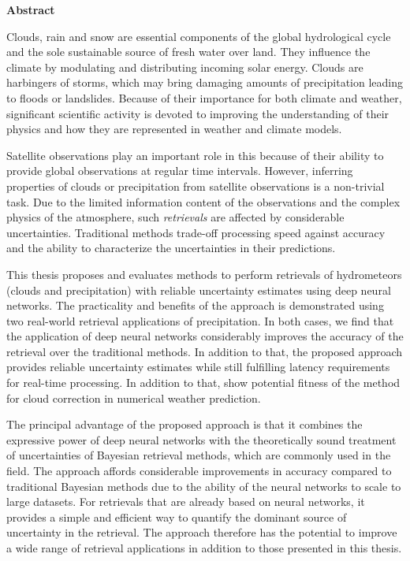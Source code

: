 \thispagestyle{plain}
\begin{center}
  {\large \textbf{\thetitle}}
  
  \vspace{0.4cm}
  
  \vspace{0.4cm}
  {\sc \theauthor}
  
  \vspace{0.9cm}
  \textbf{Abstract}
\end{center}

Clouds, rain and snow are essential components of the global hydrological cycle
and the sole sustainable source of fresh water over land. They influence the
climate by modulating and distributing incoming solar energy. Clouds are
harbingers of storms, which may bring damaging amounts of precipitation leading
to floods or landslides. Because of their importance for both climate and
weather, significant scientific activity is devoted to improving the
understanding of their physics and how they are represented in weather and
climate models.

Satellite observations play an important role in this because of their ability
to provide global observations at regular time intervals. However, inferring
properties of clouds or precipitation from satellite observations is a
non-trivial task. Due to the limited information content of the observations and
the complex physics of the atmosphere, such \textit{retrievals} are affected by
considerable uncertainties. Traditional methods trade-off processing speed
against accuracy and the ability to characterize the uncertainties in their
predictions.

This thesis proposes and evaluates methods to perform retrievals of hydrometeors
(clouds and precipitation) with reliable uncertainty estimates using deep neural
networks. The practicality and benefits of the approach is demonstrated using
two real-world retrieval applications of precipitation. In both cases, we find
that the application of deep neural networks considerably improves the accuracy
of the retrieval over the traditional methods. In addition to that, the proposed
approach provides reliable uncertainty estimates while still fulfilling latency
requirements for real-time processing. In addition to that, show potential
fitness of the method for cloud correction in numerical weather prediction.

The principal advantage of the proposed approach is that it combines the
expressive power of deep neural networks with the theoretically sound treatment
of uncertainties of Bayesian retrieval methods, which are commonly used in the
field. The approach affords considerable improvements in accuracy compared to
traditional Bayesian methods due to the ability of the neural networks to 
scale to large datasets. For retrievals that are already based on neural
networks, it provides a simple and efficient way to quantify the dominant source
of uncertainty in the retrieval. The approach therefore has the potential to
improve a wide range of retrieval applications in addition to those presented
in this thesis.





